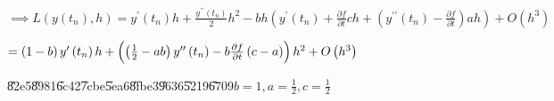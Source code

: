 \documentclass{article}
\begin{document}
$\implies L\left( y\left( t_{n}\right) ,h\right) =y^{\prime }\left(
t_{n}\right) h+\frac{y^{\prime \prime }\left( t_{n}\right) }{2}%
h^{2}-bh\left( y^{\prime }\left( t_{n}\right) +\frac{\partial f}{\partial t}%
ch+\left( y^{\prime \prime }\left( t_{n}\right) -\frac{\partial f}{\partial t%
}\right) ah\right) +O\left( h^{3}\right) $

$=\left( 1-b\right) y^{\prime }\left( t_{n}\right) h+\left( \left( \frac{1}{2%
}-ab\right) y^{\prime \prime }\left( t_{n}\right) -b\frac{\partial f}{%
\partial t}\left( c-a\right) \right) h^{2}+O\left( h^{3}\right) $

\U{82e5}\U{8981}\U{6c42}\U{7cbe}\U{5ea6}\U{8fbe}3\U{9636}\U{5219}\U{6709}$%
b=1,a=\frac{1}{2},c=\frac{1}{2}$
\end{document}
